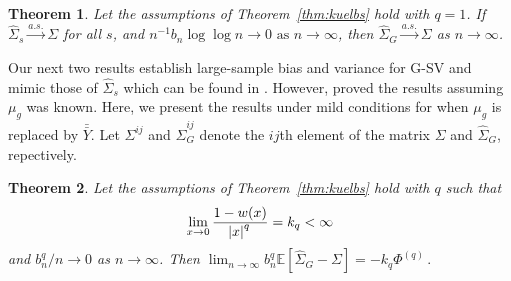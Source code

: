 \documentclass[11pt]{article}
\newtheorem{theorem}{Theorem}
\theoremstyle{remark}
\newtheorem{ass}{Assumption}
\begin{document}


\begin{theorem}
\label{th:consistency}
 Let the assumptions of Theorem~\ref{thm:kuelbs} hold with $q = 1$. If $\hat{\Sigma}_{s} \xrightarrow{a.s.} \Sigma$ for all $s$, and $n^{-1}{b_n \log \log n} \to 0 \textrm{ as } n \to \infty$, then $\hat{\Sigma}_{G} \overset{a.s.}{\to} \Sigma$ as $n \to \infty$.
\end{theorem} 

Our next two results establish large-sample bias and variance for G-SV and mimic those of $\hat{\Sigma}_s$ which can be found in \cite{hannan:1970}. However, \cite{hannan:1970} proved the results assuming $\mu_g$ was known. Here, we present the results under mild conditions for when $\mu_g$ is replaced by $\bar{\bar{Y}}$. Let $\Sigma^{ij}$ and $\hat{\Sigma}_G^{ij}$ denote the $ij$th element of the matrix $\Sigma$ and $\hat{\Sigma}_G$, repectively.

\begin{theorem}\label{th:G-SVE_bias}
Let the assumptions of Theorem~\ref{thm:kuelbs} hold with $q$ such that 
\[
\lim _{x \to 0} \dfrac{1 - w(x)}{\abs{x}^q} = k_q < \infty
\] 
and $b_n^q/n \to 0$ as $n \to \infty$. Then $ \lim_{n \to \infty}b_n^q\mathbb{E} \left[\hat{\Sigma}_{G} - \Sigma \right] = -k_q\Phi^{(q)}\,.$
\end{theorem}
\end{document}
